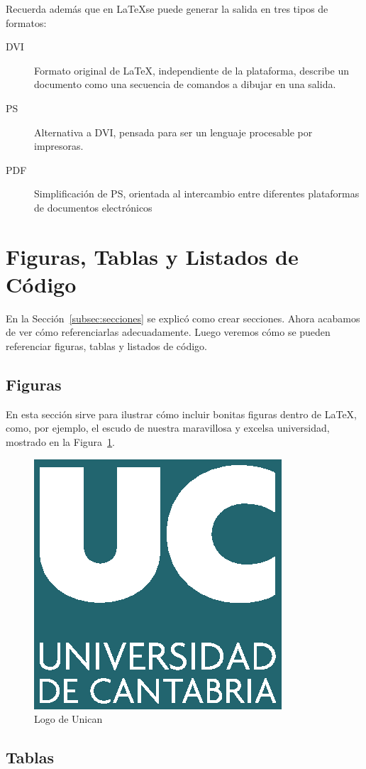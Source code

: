 \documentclass{article}
\begin{document}
Recuerda además que en \LaTeX se puede generar la salida en tres tipos de formatos:

\begin{description}
	\item[DVI] Formato original de \LaTeX, independiente de la plataforma, describe un documento como una secuencia de comandos a dibujar en una salida.
	\item[PS] Alternativa a DVI, pensada para ser un lenguaje procesable por impresoras.   
	\item[PDF] Simplificación de PS, orientada al intercambio entre diferentes plataformas	de documentos electrónicos 
\end{description}

\section{Figuras, Tablas y Listados de Código}

En la Sección~\ref{subsec:secciones} se explicó como crear secciones. Ahora acabamos de ver cómo referenciarlas adecuadamente. Luego veremos cómo se pueden referenciar figuras, tablas y listados de código.

\subsection{Figuras}

En esta sección sirve para ilustrar cómo incluir bonitas figuras dentro de \LaTeX, como, por ejemplo, el escudo de nuestra maravillosa y excelsa universidad, mostrado en la Figura~\ref{fig:logoUnican}.

\begin{figure}[!tb]
	\begin{center}
		\includegraphics[width=0.15\linewidth]{img/uc.eps}
		\caption{Logo de Unican}
		\label{fig:logoUnican}
	\end{center}
\end{figure}

\subsection{Tablas}
\end{document}
